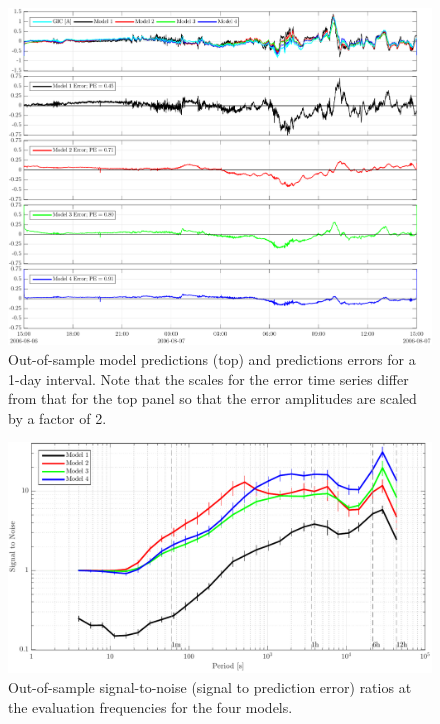 \documentclass[draft,linenumbers]{agujournal2018}
\begin{document}
\begin{figure}[h]
\centering
\includegraphics[width=\textwidth]{figures/plot_model_predictions-MeanModel-2006-08-06.pdf}
\caption{Out-of-sample model predictions (top) and predictions errors for a 1-day interval. Note that the scales for the error time series differ from that for the top panel so that the error amplitudes are scaled by a factor of 2.}
\label{predictions}
\end{figure}

\begin{figure}[h]
\centering
\includegraphics[width=\textwidth]{figures/plot_model_summary_SN-options-1.pdf}
\caption{Out-of-sample signal-to-noise (signal to prediction error) ratios at the evaluation frequencies for the four models.}
\label{SN}
\end{figure}
\end{document}
